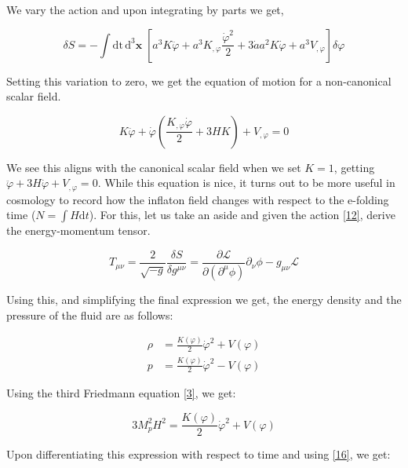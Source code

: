 \documentclass[aps,prd,reprint,preprintnumbers,showpacs,floatfix,nofootinbib,superscript address]{revtex4-2}
\begin{document}
We vary the action and upon integrating by parts we get,

\begin{equation}
    \delta S = - \int \text{dt}\,\text{d}^3\textbf{x} \; \left[ a^3 K \ddot{\varphi} + a^3K_{,\varphi} \frac{\dot{\varphi}^2}{2}  +  3\dot{a} a^2 K \dot{\varphi} + a^3V_{,\varphi}  \right]\delta \varphi
\end{equation}

Setting this variation to zero, we get the equation of motion for a non-canonical scalar field.

\begin{equation} \label{16}
    K \ddot{\varphi} + \dot{\varphi} \left(\frac{K_{,\varphi} \dot{\varphi}}{2} + 3H K \right) + V_{,\varphi}   = 0
\end{equation}

We see this aligns with the canonical scalar field when we set $K = 1$, getting  $ \ddot{\varphi} +  3H \dot{\varphi}  + V_{,\varphi}   = 0$. While this equation is nice, it turns out to be more useful in cosmology to record how the inflaton field changes with respect to the e-folding time ($N = \int H \text{d}t$). For this, let us take an aside and given the action \ref{12}, derive the energy-momentum tensor.

\begin{equation}
    T_{\mu\nu} = \frac{2}{\sqrt{-g}} \frac{\delta S}{\delta  g^{\mu \nu}} = \frac{\partial \mathcal{L}}{\partial (\partial^\mu \phi)} \partial_\nu \phi - g_{\mu\nu} \mathcal{L}
\end{equation}

Using this, and simplifying the final expression we get, the energy density and the pressure of the fluid are as follows: 

\begin{align}
    \rho &= \frac{K(\varphi)}{2} \dot{\varphi}^2 + V(\varphi) \nonumber \\
    p &= \frac{K(\varphi)}{2} \dot{\varphi}^2 - V(\varphi)
\end{align}

Using the third Friedmann equation \ref{3}, we get:

\begin{equation}    \label{Friedmann Eqn 2}
    3 M_p^2H^2 = \frac{K(\varphi)}{2} \dot{\varphi}^2 + V(\varphi)
\end{equation}

Upon differentiating this expression with respect to time and using \ref{16}, we get:
\end{document}

